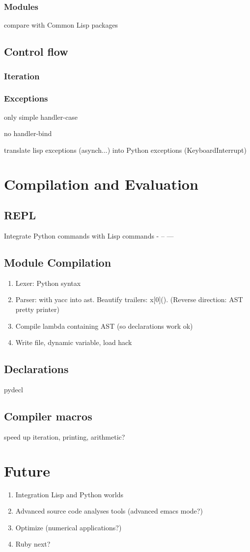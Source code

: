 \documentclass{article}
\begin{document}
\subsubsection{Modules}
compare with Common Lisp packages

\subsection{Control flow}
\subsubsection{Iteration}

\subsubsection{Exceptions}
only simple handler-case

no handler-bind

translate lisp exceptions (asynch...) into Python exceptions
(KeyboardInterrupt)


\section{Compilation and Evaluation}
\subsection{REPL}
Integrate Python commands with Lisp commands
- -- ---

\subsection{Module Compilation}

\begin{enumerate}
 \item{} Lexer: Python syntax 
 \item{} Parser: with yacc into ast. Beautify trailers: x[0](). (Reverse direction: AST pretty printer)
 \item{} Compile lambda containing AST (so declarations work ok)
 \item{} Write file, dynamic variable, load hack
\end{enumerate}

\subsection{Declarations}
pydecl

\subsection{Compiler macros}
speed up iteration, printing, arithmetic?

\section{Future}
\begin{enumerate}
 \item{} Integration Lisp and Python worlds
 \item{} Advanced source code analyses tools (advanced emacs mode?)
 \item{} Optimize (numerical applications?)
 \item{} Ruby next?
\end{enumerate}
\end{document}

